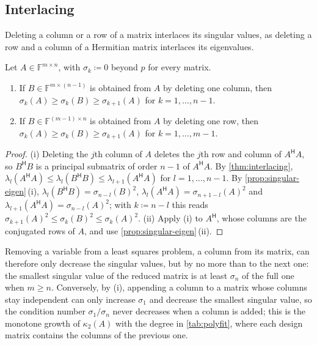 \subsection{Interlacing}

Deleting a column or a row of a matrix interlaces its singular values, as deleting a row and a column of a Hermitian matrix interlaces its eigenvalues.

\begin{theorem}
\label{thm:singular-interlacing}
Let $A\in\mathbb F^{m\times n}$, with $\sigma_k\coloneqq0$ beyond $p$ for every matrix.
\begin{enumerate}
\item If $B\in\mathbb F^{m\times(n-1)}$ is obtained from $A$ by deleting one column, then $\sigma_k(A)\ge\sigma_k(B)\ge\sigma_{k+1}(A)$ for $k=1,\ldots,n-1$.
\item If $B\in\mathbb F^{(m-1)\times n}$ is obtained from $A$ by deleting one row, then $\sigma_k(A)\ge\sigma_k(B)\ge\sigma_{k+1}(A)$ for $k=1,\ldots,m-1$.
\end{enumerate}
\end{theorem}

\begin{proof}
(i) Deleting the $j$th column of $A$ deletes the $j$th row and column of $A^{\mathsf H}A$, so $B^{\mathsf H}B$ is a principal submatrix of order $n-1$ of $A^{\mathsf H}A$. By \cref{thm:interlacing}, $\lambda_l(A^{\mathsf H}A)\le\lambda_l(B^{\mathsf H}B)\le\lambda_{l+1}(A^{\mathsf H}A)$ for $l=1,\ldots,n-1$. By \cref{prop:singular-eigen}\,(i), $\lambda_l(B^{\mathsf H}B)=\sigma_{n-l}(B)^2$, $\lambda_l(A^{\mathsf H}A)=\sigma_{n+1-l}(A)^2$ and $\lambda_{l+1}(A^{\mathsf H}A)=\sigma_{n-l}(A)^2$; with $k\coloneqq n-l$ this reads $\sigma_{k+1}(A)^2\le\sigma_k(B)^2\le\sigma_k(A)^2$. (ii) Apply (i) to $A^{\mathsf H}$, whose columns are the conjugated rows of $A$, and use \cref{prop:singular-eigen}\,(ii).
\end{proof}

Removing a variable from a least squares problem, a column from its matrix, can therefore only decrease the singular values, but by no more than to the next one: the smallest singular value of the reduced matrix is at least $\sigma_n$ of the full one when $m\ge n$. Conversely, by (i), appending a column to a matrix whose columns stay independent can only increase $\sigma_1$ and decrease the smallest singular value, so the condition number $\sigma_1/\sigma_n$ never decreases when a column is added; this is the monotone growth of $\kappa_2(A)$ with the degree in \cref{tab:polyfit}, where each design matrix contains the columns of the previous one.

